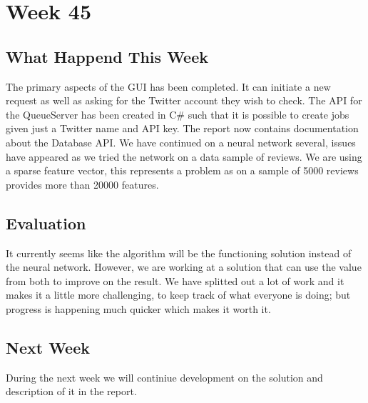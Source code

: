 \section*{Week 45}
\subsection*{What Happend This Week}
The primary aspects of the \ac{GUI} has been completed. It can initiate a new
request as well as asking for the Twitter account they wish to check. The
\ac{API} for the QueueServer has been created in C\# such that it is possible to
create jobs given just a Twitter name and \ac{API} key. The report now contains
documentation about the Database \ac{API}.
We have continued on a neural network several, issues have appeared as we
tried the network on a data sample of reviews. We are using a sparse
feature vector, this represents a problem as on a sample of 5000 reviews
provides more than 20000 features.


\subsection*{Evaluation}
It currently seems like the algorithm will be the functioning solution instead
of the neural network. However, we are working at a solution that can use the
value from both to improve on the result. We have splitted  out a lot of work
and it makes it a little more challenging, to keep track of what everyone is
doing; but progress is happening much quicker which makes it worth it.


\subsection*{Next Week}
During the next week we will continiue development on the solution and
description of it in the report.

